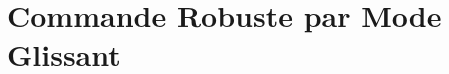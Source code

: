 \graphicspath{{Figures/}}
\chapter{Commande Robuste par Mode Glissant} \label{chap:commande robust}

 

